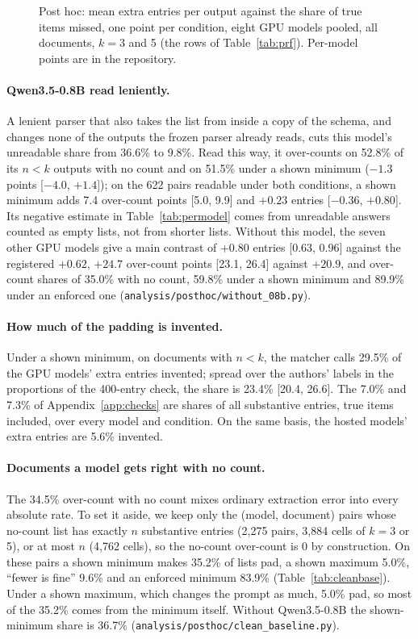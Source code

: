 \begin{figure}[t]
  \centering
  
  \caption{Post hoc: mean extra entries per output against the share of true items missed\pre{}, one point per condition, eight GPU models pooled, all documents, $k = 3$ and 5 (the rows of Table~\ref{tab:prf}). Per-model points are in the repository.}
  \label{fig:padmiss}
\end{figure}

\paragraph{Qwen3.5-0.8B read leniently.}
A lenient parser that also takes the list from inside a copy of the schema, and changes none of the outputs the frozen parser already reads, cuts this model's unreadable share from 36.6\% to 9.8\%.
Read this way, it over-counts on 52.8\% of its $n < k$ outputs with no count and on 51.5\% under a shown minimum ($-1.3$ points [$-4.0$, $+1.4$]); on the 622 pairs readable under both conditions, a shown minimum adds 7.4 over-count points [5.0, 9.9] and $+0.23$ entries [$-0.36$, $+0.80$].
Its negative estimate in Table~\ref{tab:permodel} comes from unreadable answers counted as empty lists, not from shorter lists.
Without this model, the seven other GPU models give a main contrast of $+0.80$ entries [0.63, 0.96] against the registered $+0.62$, $+24.7$ over-count points [23.1, 26.4] against $+20.9$, and over-count shares of 35.0\% with no count, 59.8\% under a shown minimum and 89.9\% under an enforced one (\texttt{analysis/posthoc/without\_08b.py}).

\paragraph{How much of the padding is invented.}
Under a shown minimum, on documents with $n < k$, the matcher calls 29.5\% of the GPU models' extra entries invented; spread over the authors' labels in the proportions of the 400-entry check, the share is 23.4\% [20.4, 26.6].
The 7.0\% and 7.3\% of Appendix~\ref{app:checks} are shares of all substantive entries, true items included, over every model and condition.
On the same basis, the hosted models' extra entries are 5.6\% invented.

\paragraph{Documents a model gets right with no count.}
The 34.5\% over-count with no count mixes ordinary extraction error into every absolute rate.
To set it aside, we keep only the (model, document) pairs whose no-count list has exactly $n$ substantive entries (2,275 pairs, 3,884 cells of $k = 3$ or 5), or at most $n$ (4,762 cells), so the no-count over-count is 0 by construction.
On these pairs a shown minimum makes 35.2\% of lists pad, a shown maximum 5.0\%, ``fewer is fine'' 9.6\% and an enforced minimum 83.9\% (Table~\ref{tab:cleanbase}).
Under a shown maximum, which changes the prompt as much, 5.0\% pad, so most of the 35.2\% comes from the minimum itself.
Without Qwen3.5-0.8B the shown-minimum share is 36.7\% (\texttt{analysis/posthoc/clean\_baseline.py}).

